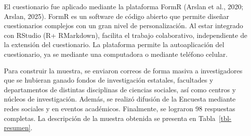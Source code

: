 \documentclass[
  letterpaper,
  DIV=11,
  numbers=noendperiod]{scrreprt}
\begin{document}
El cuestionario fue aplicado mediante la plataforma FormR (Arslan et
al., 2020; Arslan, 2025). FormR es un software de código abierto que
permite diseñar cuestionarios complejos con un gran nivel de
personalización. Al estar integrado con RStudio (R+ RMarkdown), facilita
el trabajo colaborativo, independiente de la extensión del cuestionario.
La plataforma permite la autoaplicación del cuestionario, ya se mediante
una computadora o mediante teléfono celular.

Para construir la muestra, se enviaron correos de forma masiva a
investigadores que se hubieran ganado fondos de investigación estatales,
facultades y departamentos de distintas disciplinas de ciencias
sociales, así como centros y núcleos de investigación. Además, se
realizó difusión de la Encuesta mediante redes sociales y en eventos
académicos. Finalmente, se lograron 98 respuestas completas. La
descripción de la muestra obtenida se presenta en
Tabla~\ref{tbl-resumen}.
\end{document}

